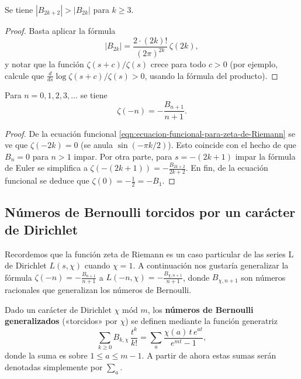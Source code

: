 \begin{corolario}
  Se tiene $|B_{2k+2}| > |B_{2k}|$ para $k \ge 3$.

  \begin{proof}
    Basta aplicar la fórmula
    $$|B_{2k}| = \frac{2\cdot (2k)!}{(2\pi)^{2k}}\,\zeta (2k),$$
    y notar que la función $\zeta (s+c)/\zeta (s)$ crece para todo $c > 0$
    (por ejemplo, calcule que $\frac{d}{ds} \log \zeta (s+c)/\zeta (s) > 0$,
    usando la fórmula del producto).
  \end{proof}
\end{corolario}

\begin{corolario}
  Para $n = 0,1,2,3,\ldots$ se tiene
  $$\zeta (-n) = -\frac{B_{n+1}}{n+1}.$$

  \begin{proof}
    De la ecuación funcional \eqref{eqn:ecuacion-funcional-para-zeta-de-Riemann}
    se ve que $\zeta (-2k) = 0$ (se anula $\sin (-\pi k/2)$). Esto coincide con
    el hecho de que $B_n = 0$ para $n > 1$ impar. Por otra parte, para
    $s = -(2k+1)$ impar la fórmula de Euler se simplifica a
    $\zeta (-(2k+1)) = -\frac{B_{2k+2}}{2k+2}$. En fin, de la ecuación funcional
    se deduce que $\zeta (0) = -\frac{1}{2} = -B_1$.
  \end{proof}
\end{corolario}

\subsection{Números de Bernoulli torcidos por un carácter de Dirichlet}

Recordemos que la función zeta de Riemann es un caso particular de las series L
de Dirichlet $L (s,\chi)$ cuando $\chi = 1$. A continuación nos gustaría
generalizar la fórmula $\zeta (-n) = -\frac{B_{n+1}}{n+1}$ a
$L (-n,\chi) = -\frac{B_{\chi,n+1}}{n+1}$, donde $B_{\chi,n+1}$ son números
racionales que generalizan los números de Bernoulli.

\begin{definicion}
  Dado un carácter de Dirichlet $\chi$ mód $m$, los
  \textbf{números de Bernoulli generalizados} («torcidos» por $\chi$) se definen
  mediante la función generatriz
  $$\sum_{k\ge 0} B_{k,\chi}\,\frac{t^k}{k!} = \sum_a \frac{\chi (a)\,t\,e^{at}}{e^{mt} - 1},$$
  donde la suma es sobre $1 \le a \le m-1$. A partir de ahora estas sumas serán
  denotadas simplemente por $\sum\limits_a$.
\end{definicion}

